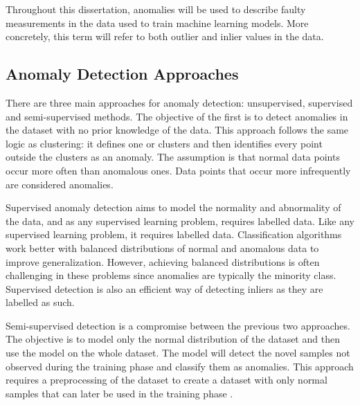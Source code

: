 Throughout this dissertation, anomalies will be used to describe faulty measurements in the data used to train machine learning models. More concretely, this term will refer to both outlier and inlier values in the data.

\subsection{Anomaly Detection Approaches}
There are three main approaches for anomaly detection: unsupervised, supervised and semi-supervised methods. The objective of the first is to detect anomalies in the dataset with no prior knowledge of the data. This approach follows the same logic as clustering: it defines one or clusters and then identifies every point outside the clusters as an anomaly. The assumption is that normal data points occur more often than anomalous ones. Data points that occur more infrequently are considered anomalies.

Supervised anomaly detection aims to model the normality and abnormality of the data, and as any supervised learning problem, requires labelled data. Like any supervised learning problem, it requires labelled data. Classification algorithms work better with balanced distributions of normal and anomalous data to improve generalization. However, achieving balanced distributions is often challenging in these problems since anomalies are typically the minority class. Supervised detection is also an efficient way of detecting inliers as they are labelled as such.

Semi-supervised detection is a compromise between the previous two approaches. The objective is to model only the normal distribution of the dataset and then use the model on the whole dataset. The model will detect the novel samples not observed during the training phase and classify them as anomalies. This approach requires a preprocessing of the dataset to create a dataset with only normal samples that can later be used in the training phase \cite{hodge.austin_SurveyOutlierDetection_2004}.



